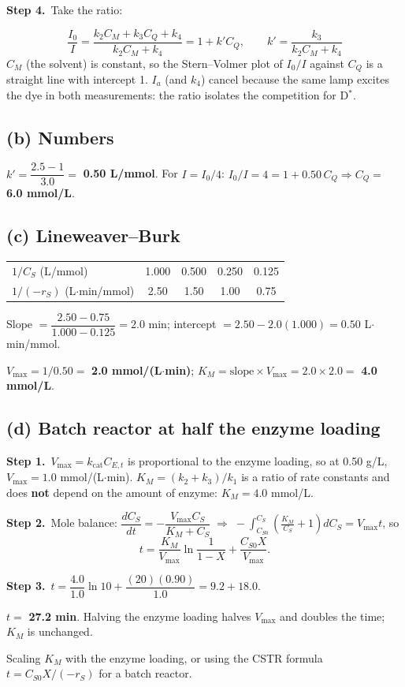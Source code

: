 \documentclass[11pt]{article}
\newcommand{\step}[1]{\par\smallskip\textbf{Step #1.}\ }
\begin{document}
\step{4}Take the ratio:
\begin{answer}
\[
\frac{I_0}{I}=\frac{k_2C_M+k_3C_Q+k_4}{k_2C_M+k_4}=1+k'C_Q,\qquad k'=\frac{k_3}{k_2C_M+k_4}
\]
$C_M$ (the solvent) is constant, so the Stern--Volmer plot of $I_0/I$ against $C_Q$ is a straight line with intercept 1.
$I_a$ (and $k_4$) cancel because the same lamp excites the dye in both measurements: the ratio isolates the competition
for D$^*$.
\end{answer}

\subsection*{(b) Numbers}
\begin{answer}
$k'=\dfrac{2.5-1}{3.0}=$ \textbf{0.50 L/mmol}. For $I=I_0/4$: $I_0/I=4=1+0.50\,C_Q\Rightarrow C_Q=$ \textbf{6.0 mmol/L}.
\end{answer}

\subsection*{(c) Lineweaver--Burk}
\begin{center}
\renewcommand{\arraystretch}{1.25}
\begin{tabular}{lcccc}
\toprule
$1/C_S$ (L/mmol) & 1.000 & 0.500 & 0.250 & 0.125\\
$1/(-r_S)$ (L$\cdot$min/mmol) & 2.50 & 1.50 & 1.00 & 0.75\\
\bottomrule
\end{tabular}
\end{center}
Slope $=\dfrac{2.50-0.75}{1.000-0.125}=2.0$ min; \quad intercept $=2.50-2.0(1.000)=0.50$ L$\cdot$min/mmol.
\begin{answer}
$V_{\max}=1/0.50=$ \textbf{2.0 mmol/(L$\cdot$min)}; \quad $K_M=\text{slope}\times V_{\max}=2.0\times2.0=$ \textbf{4.0 mmol/L}.
\end{answer}

\subsection*{(d) Batch reactor at half the enzyme loading}
\step{1}$V_{\max}=k_{\text{cat}}C_{E,t}$ is proportional to the enzyme loading, so at 0.50 g/L, $V_{\max}=1.0$ mmol/(L$\cdot$min).
$K_M=(k_2+k_3)/k_1$ is a ratio of rate constants and does \textbf{not} depend on the amount of enzyme: $K_M=4.0$ mmol/L.

\step{2}Mole balance: $\dfrac{dC_S}{dt}=-\dfrac{V_{\max}C_S}{K_M+C_S}\;\Rightarrow\;-\displaystyle\int_{C_{S0}}^{C_S}\left(\frac{K_M}{C_S}+1\right)dC_S=V_{\max}t$, so
\[
t=\frac{K_M}{V_{\max}}\ln\frac{1}{1-X}+\frac{C_{S0}X}{V_{\max}}.
\]
\step{3}$t=\dfrac{4.0}{1.0}\ln10+\dfrac{(20)(0.90)}{1.0}=9.2+18.0$.
\begin{answer}
$t=$ \textbf{27.2 min}. Halving the enzyme loading halves $V_{\max}$ and doubles the time; $K_M$ is unchanged.
\end{answer}
\begin{mistake}
Scaling $K_M$ with the enzyme loading, or using the CSTR formula $t=C_{S0}X/(-r_S)$ for a batch reactor.
\end{mistake}
\end{document}
